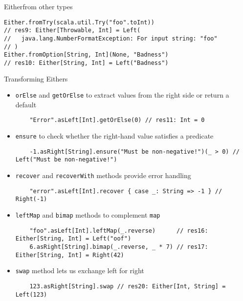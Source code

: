 \documentclass[aspectratio=169]{beamer}
\begin{document}
\begin{frame}[fragile]{Either}{from other types}
\begin{verbatim}
Either.fromTry(scala.util.Try("foo".toInt))
// res9: Either[Throwable, Int] = Left(
//   java.lang.NumberFormatException: For input string: "foo"
// )
Either.fromOption[String, Int](None, "Badness")
// res10: Either[String, Int] = Left("Badness")
\end{verbatim}
\end{frame}

\begin{frame}[fragile]{Transforming Eithers}
\setlength{\leftmargini}{-10pt}
\begin{itemize}
  \item \texttt{orElse} and \texttt{getOrElse} to extract values from the right side or return a
    default\\
    \begin{verbatim}
    "Error".asLeft[Int].getOrElse(0) // res11: Int = 0
    \end{verbatim}
  \item \texttt{ensure} to check whether the right-hand value satisfies a predicate\\
    \begin{verbatim}
    -1.asRight[String].ensure("Must be non-negative!")(_ > 0) // Left("Must be non-negative!")
    \end{verbatim}
  \item \texttt{recover} and \texttt{recoverWith} methods provide error handling\\
    \begin{verbatim}
    "error".asLeft[Int].recover { case _: String => -1 } // Right(-1)
    \end{verbatim}
  \item \texttt{leftMap} and \texttt{bimap} methods to complement \texttt{map}\\
    \begin{verbatim}
    "foo".asLeft[Int].leftMap(_.reverse)      // res16: Either[String, Int] = Left("oof")
    6.asRight[String].bimap(_.reverse, _ * 7) // res17: Either[String, Int] = Right(42)
    \end{verbatim}
  \item \texttt{swap} method lets us exchange left for right
    \begin{verbatim}
    123.asRight[String].swap // res20: Either[Int, String] = Left(123)
    \end{verbatim}
\end{itemize}
\end{frame}
\end{document}
